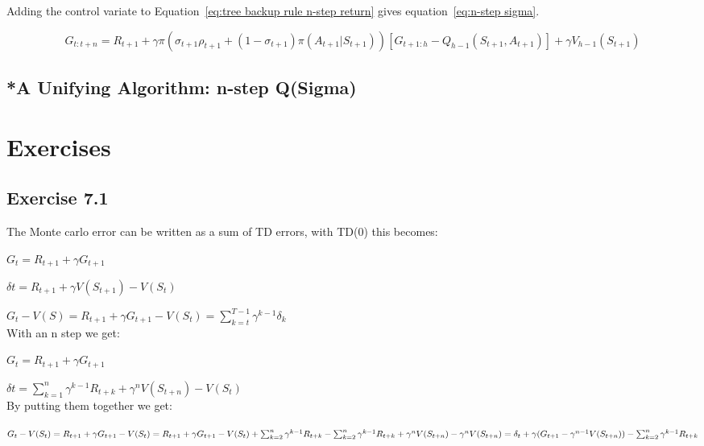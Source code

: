 Adding the control variate to Equation~\ref{eq:tree backup rule n-step return} gives equation~\ref{eq:n-step sigma}.

\begin{equation}
G_{t:t+n}  = R_{t+1} + \gamma \pi (\sigma_{t+1}\rho_{t+1} + (1-\sigma_{t+1})\pi(A_{t+1}|S_{t+1})) [G_{t+1:h}-Q_{h-1}(S_{t+1}, A_{t+1})] + \gamma V_{h-1} (S_{t+1})
\label{eq:n-step sigma}
\end{equation}

\subsection{*A Unifying Algorithm: n-step Q(Sigma)}


\section{Exercises}

\subsection{Exercise 7.1}

The Monte carlo error can be written as a sum of TD errors, with TD(0) this becomes:

$
G_t = R_{t+1} + \gamma G_{t+1}
$

$
\delta{t} = R_{t+1} + \gamma V(S_{t+1}) - V(S_t)
$

$
G_t - V(S) = R_{t+1} + \gamma G_{t+1} - V(S_{t}) = \sum^{T-1}_{k=t} \gamma^{k-1}\delta_k
$\\

With an n step we get:

$
G_t = R_{t+1} + \gamma G_{t+1}
$

$
\delta{t} =  \sum_{k=1}^{n} \gamma^{k-1} R_{t+k} + \gamma^{n}V(S_{t+n}) - V(S_{t})
$\\

By putting them together we get:

$
G_t - V(S_t)\\
= R_{t+1} + \gamma G_{t+1} - V(S_t)\\
= R_{t+1} + \gamma G_{t+1} - V(S_t)\\
+  \sum_{k=2}^{n} \gamma^{k-1} R_{t+k} - \sum_{k=2}^{n}\gamma^{k-1} R_{t+k}\\
+ \gamma^{n}V(S_{t+n}) - \gamma^{n}V(S_{t+n})\\
= \delta_t + \gamma (G_{t+1} - \gamma^{n-1}V(S_{t+n}))  - \sum_{k=2}^{n}\gamma^{k-1} R_{t+k}
$

